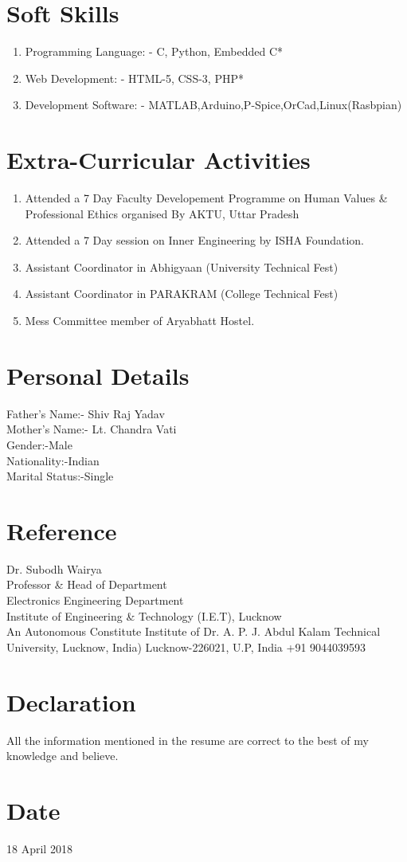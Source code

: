 \documentclass[12pt]{article}
\begin{document}
\section*{Soft Skills}
\begin{enumerate}

  \item Programming Language: - C, Python, Embedded C*
  \item Web Development: - HTML-5, CSS-3, PHP*
  \item Development Software: - MATLAB,Arduino,P-Spice,OrCad,Linux(Rasbpian)
  \end{enumerate}
  
\section*{Extra-Curricular Activities}
\begin{enumerate}
\item Attended a 7 Day Faculty Developement Programme on Human Values \& Professional Ethics organised By
AKTU, Uttar Pradesh
\item Attended a 7 Day session on Inner Engineering by ISHA Foundation.
\item Assistant Coordinator in Abhigyaan (University Technical Fest)
\item Assistant Coordinator in PARAKRAM (College Technical Fest)
\item Mess Committee member of Aryabhatt Hostel.
\end{enumerate}



\section*{Personal Details}
{\large {Father's Name:- \hspace{1.1cm} Shiv Raj Yadav\\
Mother's Name:- \hspace{1cm} Lt. Chandra Vati\\
Gender:-\hspace{2.9cm}Male\\
Nationality:-\hspace{2.0cm}Indian\\
Marital Status:-\hspace{1.4cm}Single\\
}}

\section*{\large {Reference}}
Dr. Subodh Wairya\\
Professor \& Head of Department\\
Electronics Engineering Department\\
Institute of Engineering \& Technology (I.E.T), Lucknow\\
An Autonomous Constitute Institute of Dr. A. P. J. Abdul Kalam Technical University, Lucknow, India)
Lucknow-226021, U.P, India
+91 9044039593

\section*{\large {Declaration}}
All the information mentioned in the resume are correct to the best of my knowledge and believe.
\section*{\large {Date}}
18 April 2018
 
\end{document}
